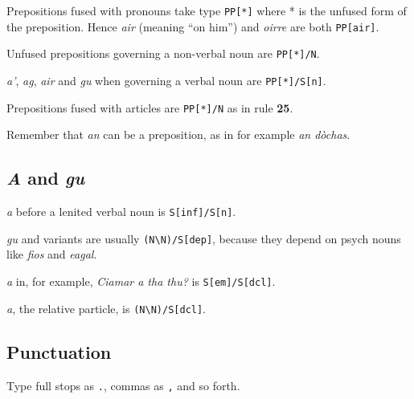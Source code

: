 \documentclass[a4paper]{article}
\begin{document}
 Prepositions fused with pronouns take type \texttt{PP[*]} where * is the unfused form of the preposition.
Hence \textit{air} (meaning ``on him'') and \textit{oirre} are both \texttt{PP[air]}.

 Unfused prepositions governing a non-verbal noun are \texttt{PP[*]/N}.

 \textit{a'}, \textit{ag}, \textit{air} and \textit{gu} when governing a verbal noun are \texttt{PP[*]/S[n]}.

 Prepositions fused with articles are \texttt{PP[*]/N} as in rule {\bf 25}.

 Remember that \textit{an} can be a preposition, as in for example \textit{an d\`ochas}.

\subsection{\textit{A} and \textit{gu}}

 \textit{a} before a lenited verbal noun is \texttt{S[inf]/S[n]}.

 \textit{gu} and variants are usually \texttt{(N\textbackslash N)/S[dep]}, because they depend on psych nouns like \textit{fios} and \textit{eagal}.

 \textit{a} in, for example, \textit{Ciamar a tha thu?} is \texttt{S[em]/S[dcl]}.

 \textit{a}, the relative particle, is \texttt{(N\textbackslash N)/S[dcl]}.

\subsection{Punctuation}

 Type full stops as \texttt{.}, commas as \texttt{,} and so forth.
\end{document}
